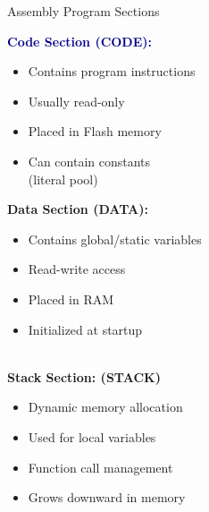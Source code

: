 \begin{concept}{Assembly Program Sections}
\begin{minipage}[t]{0.5\linewidth}
\textcolor{darkblue}{\textbf{Code Section (CODE):}}
\begin{itemize}
  \item Contains program instructions
  \item Usually read-only
  \item Placed in Flash memory
  \item Can contain constants \\(literal pool)
\end{itemize}
\end{minipage}
\begin{minipage}[t]{0.5\linewidth}
\textcolor{darktangerine}{\textbf{Data Section (DATA):}}
\begin{itemize}
  \item Contains global/static variables
  \item Read-write access
  \item Placed in RAM
  \item Initialized at startup
\end{itemize}
\end{minipage}
\vspace{2mm}\\
\textcolor{darkfrog}{\textbf{Stack Section: (STACK)}}
\begin{itemize}
  \item Dynamic memory allocation
  \item Used for local variables
  \item Function call management
  \item Grows downward in memory
\end{itemize}
\end{concept}

